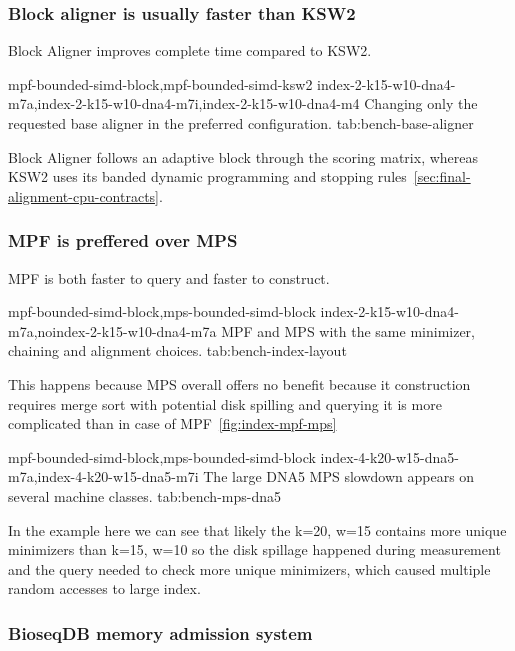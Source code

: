 \subsubsection{Block aligner is usually faster than KSW2}
\label{sec:bench-base-aligner}

Block Aligner improves complete time compared to KSW2.

  {mpf-bounded-simd-block,mpf-bounded-simd-ksw2}
  {index-2-k15-w10-dna4-m7a,index-2-k15-w10-dna4-m7i,index-2-k15-w10-dna4-m4}
  {Changing only the requested base aligner in the preferred configuration.}
  {tab:bench-base-aligner}

Block Aligner follows an adaptive block through the scoring matrix, whereas
KSW2 uses its banded dynamic programming and stopping rules~\ref{sec:final-alignment-cpu-contracts}.

\subsubsection{MPF is preffered over MPS}
\label{sec:bench-index-layout}

MPF is both faster to query and faster to construct.

  {mpf-bounded-simd-block,mps-bounded-simd-block}
  {index-2-k15-w10-dna4-m7a,noindex-2-k15-w10-dna4-m7a}
  {MPF and MPS with the same minimizer, chaining and alignment choices.}
  {tab:bench-index-layout}

This happens because MPS overall offers no benefit because it construction requires merge sort with potential disk spilling and querying it is more complicated than in case of MPF~\ref{fig:index-mpf-mps}


  {mpf-bounded-simd-block,mps-bounded-simd-block}
  {index-4-k20-w15-dna5-m7a,index-4-k20-w15-dna5-m7i}
  {The large DNA5 MPS slowdown appears on several machine classes.}
  {tab:bench-mps-dna5}

In the example here we can see that likely the k=20, w=15 contains more unique minimizers than k=15, w=10 so the disk spillage happened 
during measurement and the query needed to check more unique minimizers, which caused multiple random accesses to large index.

\subsubsection{BioseqDB memory admission system}
\label{sec:bench-machine-pressure}

